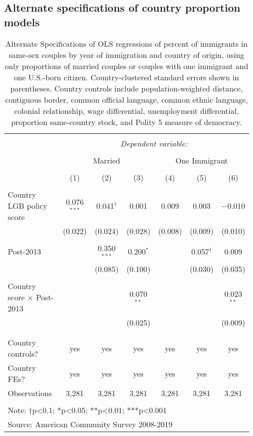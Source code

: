 \documentclass[
  11pt,
]{article}
\begin{document}
\newpage

\hypertarget{alternate-specifications-of-country-proportion-models}{%
\subsection{Alternate specifications of country proportion models}\label{alternate-specifications-of-country-proportion-models}}

\begin{table}[!htbp] \centering 
  \caption{Alternate Specifications of OLS regressions of percent of immigrants in same-sex couples by year of immigration and country of origin, using only proportions of married couples or couples with one immigrant and one U.S.-born citizen. Country-clustered standard errors shown in parentheses. Country controls include population-weighted distance, contiguous border, common official language, common ethnic language, colonial relationship, wage differential, unemployment differential, proportion same-country stock, and Polity 5 measure of democracy.} 
  \label{tab:country-props-alt} 
\begin{tabular}{@{\extracolsep{5pt}}lcccccc} 
\\[-1.8ex]\hline 
\hline \\[-1.8ex] 
 & \multicolumn{6}{c}{\textit{Dependent variable:}} \\ 
\cline{2-7} 
\\[-1.8ex] & \multicolumn{3}{c}{Married} & \multicolumn{3}{c}{One Immigrant} \\ 
\\[-1.8ex] & (1) & (2) & (3) & (4) & (5) & (6)\\ 
\hline \\[-1.8ex] 
 Country LGB policy score & 0.076$^{***}$ & 0.041$^{†}$ & 0.001 & 0.009 & 0.003 & $-$0.010 \\ 
  & (0.022) & (0.024) & (0.028) & (0.008) & (0.009) & (0.010) \\ 
  & & & & & & \\ 
 Post-2013 &  & 0.350$^{***}$ & 0.200$^{*}$ &  & 0.057$^{†}$ & 0.009 \\ 
  &  & (0.085) & (0.100) &  & (0.030) & (0.035) \\ 
  & & & & & & \\ 
 Country score × Post-2013 &  &  & 0.070$^{**}$ &  &  & 0.023$^{**}$ \\ 
  &  &  & (0.025) &  &  & (0.009) \\ 
  & & & & & & \\ 
\hline \\[-1.8ex] 
Country controls? & yes & yes & yes & yes & yes & yes \\ 
Country FEs? & yes & yes & yes & yes & yes & yes \\ 
Observations & 3,281 & 3,281 & 3,281 & 3,281 & 3,281 & 3,281 \\ 
\hline 
\hline \\[-1.8ex] 
\multicolumn{7}{l}{Note: †p<0.1; *p<0.05; **p<0.01; ***p<0.001} \\ 
\multicolumn{7}{l}{Source: American Community Survey 2008-2019} \\ 
\end{tabular} 
\end{table}
\end{document}
